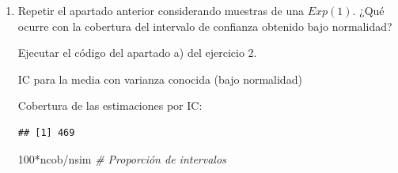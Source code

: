 \documentclass[
]{book}
\newenvironment{Shaded}{\begin{snugshade}}{\end{snugshade}}
\newcommand{\CommentTok}[1]{\textcolor[rgb]{0.56,0.35,0.01}{\textit{#1}}}
\newcommand{\DecValTok}[1]{\textcolor[rgb]{0.00,0.00,0.81}{#1}}
\newcommand{\FloatTok}[1]{\textcolor[rgb]{0.00,0.00,0.81}{#1}}
\newcommand{\FunctionTok}[1]{\textcolor[rgb]{0.00,0.00,0.00}{#1}}
\newcommand{\NormalTok}[1]{#1}
\newcommand{\OtherTok}[1]{\textcolor[rgb]{0.56,0.35,0.01}{#1}}
\newcommand{\SpecialCharTok}[1]{\textcolor[rgb]{0.00,0.00,0.00}{#1}}
\theoremstyle{break}
\theoremstyle{definition}
\theoremstyle{definition}
\theoremstyle{definition}
\theoremstyle{definition}
\theoremstyle{remark}
\begin{document}
\begin{enumerate}
\def\labelenumi{\alph{enumi})}
\setcounter{enumi}{1}
\item
  Repetir el apartado anterior considerando muestras de una
  \(Exp(1)\). ¿Qué ocurre con la cobertura del intervalo de
  confianza obtenido bajo normalidad?

  Ejecutar el código del apartado a) del ejercicio 2.

  IC para la media con varianza conocida (bajo normalidad)

\begin{Shaded}
\end{Shaded}

  Cobertura de las estimaciones por IC:

\begin{Shaded}
\end{Shaded}

\begin{verbatim}
## [1] 469
\end{verbatim}

\begin{Shaded}
\begin{Highlighting}[]
\DecValTok{100}\SpecialCharTok{*}\NormalTok{ncob}\SpecialCharTok{/}\NormalTok{nsim     }\CommentTok{\# Proporción de intervalos}
\end{Highlighting}
\end{Shaded}


\end{enumerate}
\end{document}
